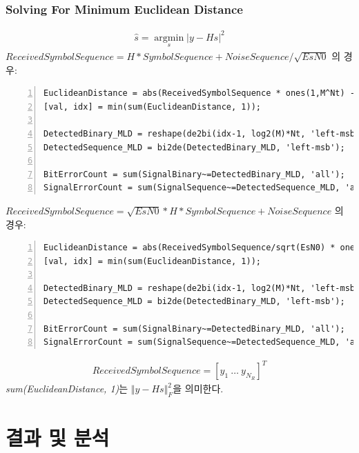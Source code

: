 \documentclass{article}
\providecommand{\abs}[1]{\lvert#1\rvert}
\begin{document}
\subsubsection{Solving For Minimum Euclidean Distance}
\begin{gather}
\hat{s}=\operatorname*{argmin}_s \abs{y-Hs}^2
\end{gather}
$ReceivedSymbolSequence = H * SymbolSequence + NoiseSequence / \sqrt{EsN0}$ 의 경우:
\begin{lstlisting}[style=Matlab-editor, frame=single, numbers=left,]
% 'EuclideanDistance' results in Nt x M^Nt, each column representing each candidate symbol combination
EuclideanDistance = abs(ReceivedSymbolSequence * ones(1,M^Nt) - H*Candidates).^2;
[val, idx] = min(sum(EuclideanDistance, 1));

DetectedBinary_MLD = reshape(de2bi(idx-1, log2(M)*Nt, 'left-msb'),log2(M),[])';
DetectedSequence_MLD = bi2de(DetectedBinary_MLD, 'left-msb');

BitErrorCount = sum(SignalBinary~=DetectedBinary_MLD, 'all');
SignalErrorCount = sum(SignalSequence~=DetectedSequence_MLD, 'all');
\end{lstlisting}
$ReceivedSymbolSequence = \sqrt{EsN0} * H * SymbolSequence + NoiseSequence$ 의 경우:
\begin{lstlisting}[style=Matlab-editor, frame=single, numbers=left,]
% 'EuclideanDistance' results in Nt x M^Nt, each column representing each candidate symbol combination
EuclideanDistance = abs(ReceivedSymbolSequence/sqrt(EsN0) * ones(1,M^Nt) - H*Candidates).^2;
[val, idx] = min(sum(EuclideanDistance, 1));

DetectedBinary_MLD = reshape(de2bi(idx-1, log2(M)*Nt, 'left-msb'),log2(M),[])';
DetectedSequence_MLD = bi2de(DetectedBinary_MLD, 'left-msb');

BitErrorCount = sum(SignalBinary~=DetectedBinary_MLD, 'all');
SignalErrorCount = sum(SignalSequence~=DetectedSequence_MLD, 'all');
\end{lstlisting}
\begin{gather}
ReceivedSymbolSequence=[y_1\ \hdots\ y_{N_R}]^T
\end{gather}
\textsl{sum(EuclideanDistance, 1)}는 $\Vert y-Hs\Vert_F^2$을 의미한다.
\section{결과 및 분석}
\end{document}

